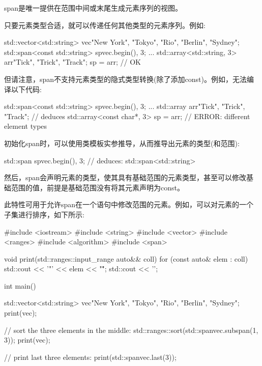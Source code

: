 span是唯一提供在范围中间或末尾生成元素序列的视图。

只要元素类型合适，就可以传递任何其他类型的元素序列。例如:

\begin{cpp}
std::vector<std::string> vec{"New York", "Tokyo", "Rio", "Berlin", "Sydney"};
std::span<const std::string> sp{vec.begin(), 3};
...
std::array<std::string, 3> arr{"Tick", "Trick", "Track"};
sp = arr; // OK
\end{cpp}

但请注意，span不支持元素类型的隐式类型转换(除了添加const)。例如，无法编译以下代码:

\begin{cpp}
std::span<const std::string> sp{vec.begin(), 3};
...
std::array arr{"Tick", "Trick", "Track"}; // deduces std::array<const char*, 3>
sp = arr; // ERROR: different element types
\end{cpp}


初始化span时，可以使用类模板实参推导，从而推导出元素的类型(和范围):

\begin{cpp}
std::span sp{vec.begin(), 3}; // deduces: std::span<std::string>
\end{cpp}

然后，span会声明元素的类型，使其具有基础范围的元素类型，甚至可以修改基础范围的值，前提是基础范围没有将其元素声明为const。

此特性可用于允许span在一个语句中修改范围的元素。例如，可以对元素的一个子集进行排序，如下所示:


\begin{cpp}
#include <iostream>
#include <string>
#include <vector>
#include <ranges>
#include <algorithm>
#include <span>

void print(std::ranges::input_range auto&& coll)
{
	for (const auto& elem : coll) {
		std::cout << '"' << elem << "\" ";
	}
	std::cout << '\n';
}

int main()
{
	std::vector<std::string> vec{"New York", "Tokyo", "Rio", "Berlin", "Sydney"};
	print(vec);
	
	// sort the three elements in the middle:
	std::ranges::sort(std::span{vec}.subspan(1, 3));
	print(vec);
	
	// print last three elements:
	print(std::span{vec}.last(3));
}
\end{cpp}

